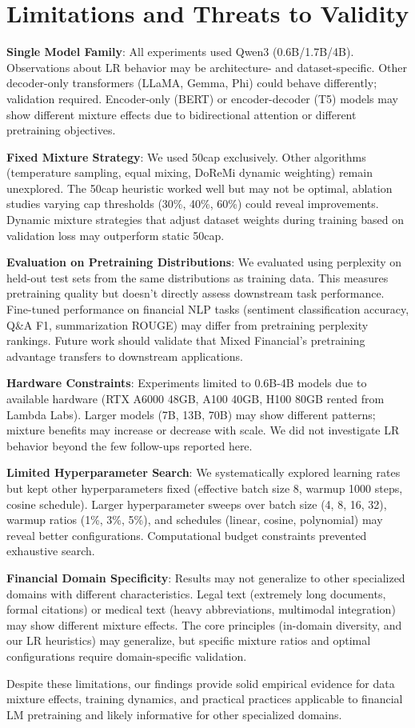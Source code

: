 \section{Limitations and Threats to Validity}

\textbf{Single Model Family}: All experiments used Qwen3 (0.6B/1.7B/4B). Observations about LR behavior may be architecture- and dataset-specific. Other decoder-only transformers (LLaMA, Gemma, Phi) could behave differently; validation required. Encoder-only (BERT) or encoder-decoder (T5) models may show different mixture effects due to bidirectional attention or different pretraining objectives.

\textbf{Fixed Mixture Strategy}: We used 50cap exclusively. Other algorithms (temperature sampling, equal mixing, DoReMi dynamic weighting) remain unexplored. The 50cap heuristic worked well but may not be optimal, ablation studies varying cap thresholds (30\%, 40\%, 60\%) could reveal improvements. Dynamic mixture strategies that adjust dataset weights during training based on validation loss may outperform static 50cap.

\textbf{Evaluation on Pretraining Distributions}: We evaluated using perplexity on held-out test sets from the same distributions as training data. This measures pretraining quality but doesn't directly assess downstream task performance. Fine-tuned performance on financial NLP tasks (sentiment classification accuracy, Q\&A F1, summarization ROUGE) may differ from pretraining perplexity rankings. Future work should validate that Mixed Financial's pretraining advantage transfers to downstream applications.

\textbf{Hardware Constraints}: Experiments limited to 0.6B-4B models due to available hardware (RTX A6000 48GB, A100 40GB, H100 80GB rented from Lambda Labs). Larger models (7B, 13B, 70B) may show different patterns; mixture benefits may increase or decrease with scale. We did not investigate LR behavior beyond the few follow-ups reported here.

\textbf{Limited Hyperparameter Search}: We systematically explored learning rates but kept other hyperparameters fixed (effective batch size 8, warmup 1000 steps, cosine schedule). Larger hyperparameter sweeps over batch size (4, 8, 16, 32), warmup ratios (1\%, 3\%, 5\%), and schedules (linear, cosine, polynomial) may reveal better configurations. Computational budget constraints prevented exhaustive search.

\textbf{Financial Domain Specificity}: Results may not generalize to other specialized domains with different characteristics. Legal text (extremely long documents, formal citations) or medical text (heavy abbreviations, multimodal integration) may show different mixture effects. The core principles (in-domain diversity, and our LR heuristics) may generalize, but specific mixture ratios and optimal configurations require domain-specific validation.

Despite these limitations, our findings provide solid empirical evidence for data mixture effects, training dynamics, and practical practices applicable to financial LM pretraining and likely informative for other specialized domains.
